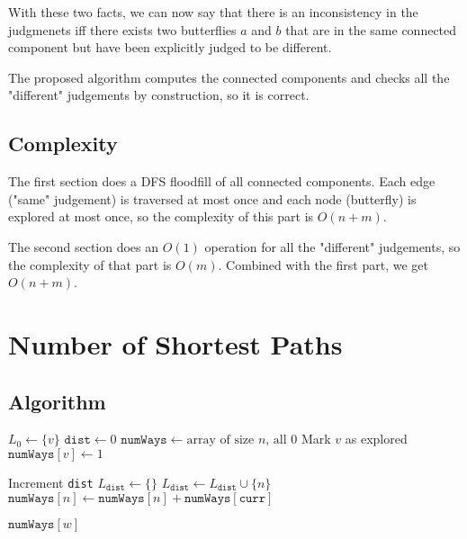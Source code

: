 \documentclass[12pt]{article}
\begin{document}
With these two facts, we can now say that there is an inconsistency in
the judgmenets iff there exists two butterflies $a$ and $b$
that are in the same connected component but have been explicitly
judged to be different.

The proposed algorithm computes the connected components
and checks all the "different" judgements by construction, so it is correct.

\subsection{Complexity}

The first section does a DFS floodfill of all connected components.
Each edge ("same" judgement) is traversed at most once and each node (butterfly)
is explored at most once, so the complexity of this part is $O(n+m)$.

The second section does an $O(1)$ operation for all the "different" judgements,
so the complexity of that part is $O(m)$.
Combined with the first part, we get $\boxed{O(n+m)}$.

\pagebreak

\section{Number of Shortest Paths}

\subsection{Algorithm}

\begin{algorithmic}[1]
    \State $L_0 \gets \{v\}$
    \State $\texttt{dist} \gets 0$
    \State $\texttt{numWays} \gets \text{array of size }n\text{, all }0$
    \State Mark $v$ as explored
    \State $\texttt{numWays}[v] \gets 1$

    \item[]
        \State Increment \texttt{dist}
        \State $L_{\texttt{dist}} \gets \{\}$
                    \State $L_{\texttt{dist}} \gets L_{\texttt{dist}} \cup \{n\}$
                \EndIf
                    \State $\texttt{numWays}[n] \gets \texttt{numWays}[n] + \texttt{numWays}[\texttt{curr}]$
                \EndIf
            \EndFor
        \EndFor
    \EndWhile

    \item[]
    \State \Return $\texttt{numWays}[w]$
\end{algorithmic}
\end{document}
